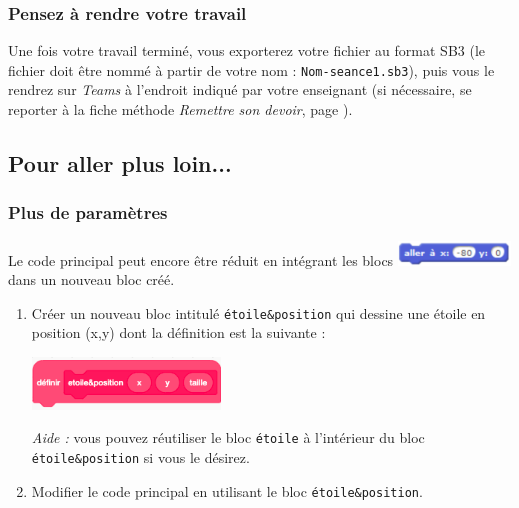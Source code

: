 
\subsubsection{Pensez à rendre votre travail}
Une fois votre travail terminé, vous exporterez votre fichier au format SB3 (le fichier doit être nommé à partir de votre nom : \texttt{Nom-seance1.sb3}), puis vous le rendrez sur \emph{Teams} à l'endroit indiqué par votre enseignant (si nécessaire, se reporter à la fiche méthode \emph{Remettre son devoir}, page \pageref{TeamsRemettreDevoir}).

\subsection{Pour aller plus loin...}

\subsubsection{Plus de paramètres}

Le code principal peut encore être réduit en intégrant les blocs \includegraphics[width=3cm]{./images/scratch03/fonction/Scratch_Fonctions_11} dans un nouveau bloc créé.

\begin{enumerate}
\item Créer un nouveau bloc intitulé \texttt{étoile\&position} qui dessine une étoile en position (x,y) dont la définition est la suivante :
\begin{center}\includegraphics[width=5cm]{./images/scratch03/fonction/bloc_allerPlusLoin.png}\end{center}

\emph{Aide :} vous pouvez réutiliser le bloc \texttt{étoile} à l’intérieur du bloc \texttt{étoile\&position} si vous le désirez.

\item Modifier le code principal en utilisant le bloc \texttt{étoile\&position}.
\end{enumerate}

